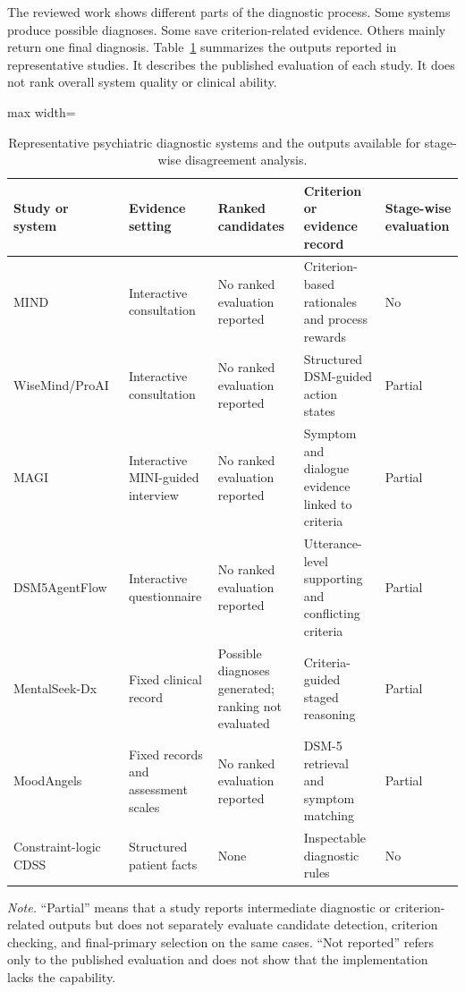 \documentclass[12pt,a4paper,oneside]{report}
\begin{document}
The reviewed work shows different parts of the diagnostic process. Some systems produce possible diagnoses. Some save criterion-related evidence. Others mainly return one final diagnosis. Table~\ref{tab:related-work-matrix} summarizes the outputs reported in representative studies. It describes the published evaluation of each study. It does not rank overall system quality or clinical ability.

\begin{table}[htbp]
\centering
\caption{Representative psychiatric diagnostic systems and the outputs available for stage-wise disagreement analysis.}
\label{tab:related-work-matrix}
\small
\begin{adjustbox}{max width=\textwidth}
\begin{tabular}{|>{\raggedright\arraybackslash}p{2.5cm}|>{\raggedright\arraybackslash}p{2.7cm}|>{\raggedright\arraybackslash}p{3.1cm}|>{\raggedright\arraybackslash}p{4.3cm}|>{\centering\arraybackslash}p{2.0cm}|}
\hline
Study or system & Evidence setting & Ranked candidates & Criterion or evidence record & Stage-wise evaluation\\
\hline
MIND~\citep{li2026mind} & Interactive consultation & No ranked evaluation reported & Criterion-based rationales and process rewards & No\\
\hline
WiseMind/\allowbreak ProAI~\citep{wu2026wisemind} & Interactive consultation & No ranked evaluation reported & Structured DSM-guided action states & Partial\\
\hline
MAGI~\citep{bi2025magi} & Interactive MINI-guided interview & No ranked evaluation reported & Symptom and dialogue evidence linked to criteria & Partial\\
\hline
DSM5Agent\allowbreak Flow~\citep{ozgun2025dsm5agentflow} & Interactive questionnaire & No ranked evaluation reported & Utterance-level supporting and conflicting criteria & Partial\\
\hline
MentalSeek-Dx~\citep{sun2026mentalseek} & Fixed clinical record & Possible diagnoses generated; ranking not evaluated & Criteria-guided staged reasoning & Partial\\
\hline
Mood\allowbreak Angels~\citep{xiao2025moodangels} & Fixed records and assessment scales & No ranked evaluation reported & DSM-5 retrieval and symptom matching & Partial\\
\hline
Constraint-logic CDSS~\citep{kim2025clp} & Structured patient facts & None & Inspectable diagnostic rules & No\\
\hline
\end{tabular}
\end{adjustbox}

\vspace{0.4em}
\begin{minipage}{0.98\textwidth}
\footnotesize
\textit{Note.} ``Partial'' means that a study reports intermediate diagnostic or criterion-related outputs but does not separately evaluate candidate detection, criterion checking, and final-primary selection on the same cases. ``Not reported'' refers only to the published evaluation and does not show that the implementation lacks the capability.
\end{minipage}
\end{table}
\FloatBarrier
\end{document}
